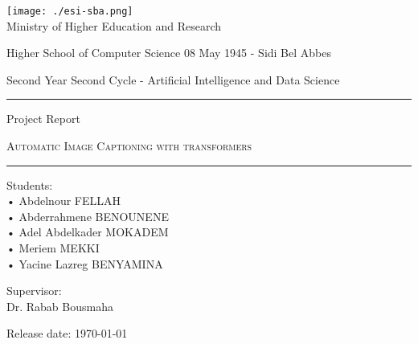 \documentclass[a4paper,10pt]{article}
\begin{document}
\begin{titlepage}
	\setlength{\parindent}{0pt}
	\large
\centering
\texttt{[image: ./esi-sba.png]} \\
\vspace{0.5cm}
Ministry of Higher Education and Research \par
Higher School of Computer Science 08 May 1945 - Sidi Bel Abbes \par
\vspace{0.5cm}
Second Year Second Cycle - Artificial Intelligence and Data Science
\vspace{5cm}
\hrule
\vspace{0.5cm}
{\large Project Report\par}

\vspace{0.25cm}
{\LARGE\scshape Automatic Image Captioning with transformers\par}

\vspace{0.75cm}
\hrule

\vfill

\begin{minipage}[t]{.5\linewidth}
	Students: \vspace{0.25cm}\\
	• Abdelnour FELLAH \\
	• Abderrahmene BENOUNENE \\
	• Adel Abdelkader MOKADEM \\
        • Meriem MEKKI\\
	• Yacine Lazreg BENYAMINA \\
\end{minipage}%
\begin{minipage}[t]{.5\linewidth}
	\raggedleft
	Supervisor:\vspace{0.25cm}\\
	Dr. Rabab Bousmaha
\end{minipage}

\vspace{4cm}
\raggedright
Release date: \today
\end{titlepage}

\newpage
\renewcommand{\contentsname}{\begin{center}{Table of contents}\end{center}}
\tableofcontents
\newpage
\renewcommand{\contentsname}{\begin{center}{Table of figures}\end{center}}
\listoffigures
\newpage
\renewcommand{\contentsname}{\begin{center}{Table of tables}\end{center}}
\listoftables
\newpage
\end{document}
